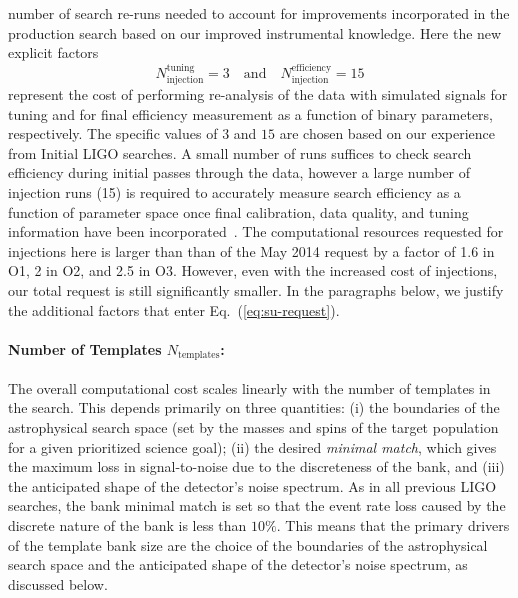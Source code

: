 number of search re-runs needed to account for improvements incorporated in
the production search based on our improved instrumental knowledge. Here the
new explicit factors
\begin{equation*}
N_\textrm{injection}^\textrm{tuning} = 3 \quad \textrm{and} \quad
N_\textrm{injection}^\textrm{efficiency} = 15
\end{equation*} 
represent the cost of performing re-analysis of the data with simulated
signals for tuning and for final efficiency measurement as a function of
binary parameters, respectively. The specific values of $3$ and $15$ are
chosen based on our experience from Initial LIGO searches. A small number of runs
suffices to check search efficiency during initial passes through the data,
however a large number of injection runs (15) is required to accurately
measure search efficiency as a function of parameter space once final
calibration, data quality, and tuning information have been
incorporated~\cite{Colaboration:2011np}. The computational resources
requested for injections here is larger than than of the May 2014 request by a
factor of 1.6 in O1, 2 in O2, and 2.5 in O3. However, even with the increased
cost of injections, our total request is still significantly smaller.
In the paragraphs below, we justify
the additional factors that enter Eq.~(\ref{eq:su-request}).

\vspace*{-15pt}
\paragraph{Number of Templates $N_\textrm{templates}$:}
The overall computational cost scales linearly with the number of templates in
the search. This depends primarily on three quantities: (i) the boundaries of
the astrophysical search space (set by the masses and spins of the target
population for a given prioritized science goal); (ii) the desired
\emph{minimal match}, which gives the maximum loss in signal-to-noise due to
the discreteness of the bank, and (iii) the anticipated shape of the
detector's noise spectrum.  As in all previous LIGO searches, the bank minimal
match is set so that the event rate loss caused by the discrete nature of the
bank is less than $10\%$. This means that the primary drivers of the template
bank size are the choice of the boundaries of the astrophysical search space
and the anticipated shape of the detector's noise spectrum, as discussed
below.

